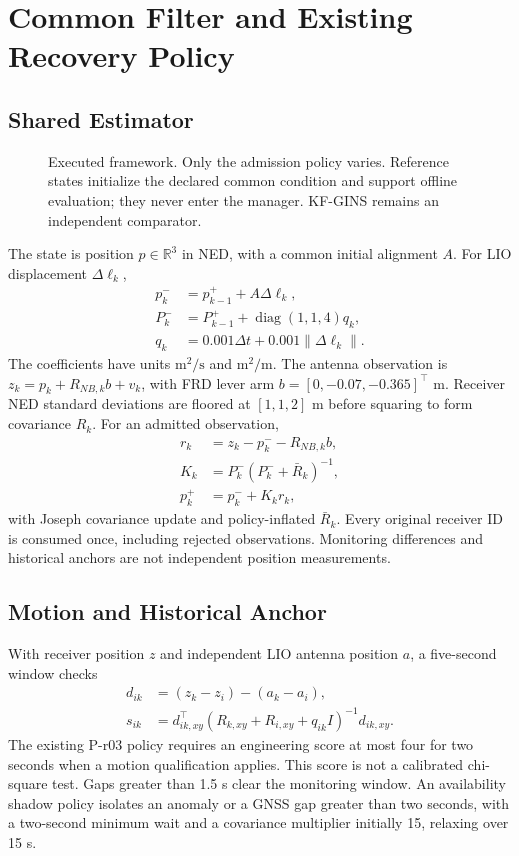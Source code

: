 \documentclass[conference]{IEEEtran}
\begin{document}
\section{Common Filter and Existing Recovery Policy}
\subsection{Shared Estimator}
\begin{figure}[t]
\centering

\caption{Executed framework. Only the admission policy varies. Reference states initialize the declared common condition and support offline evaluation; they never enter the manager. KF-GINS remains an independent comparator.}
\label{fig:framework}
\end{figure}
The state is position $p\in\mathbb{R}^{3}$ in NED, with a common initial alignment $A$. For LIO displacement $\Delta\ell_k$,
\begin{align}
 p_k^-&=p_{k-1}^++A\Delta\ell_k,\\
 P_k^-&=P_{k-1}^++\operatorname{diag}(1,1,4)q_k,\\
 q_k&=0.001\Delta t+0.001\|\Delta\ell_k\|.
\end{align}
The coefficients have units $\mathrm{m^2/s}$ and $\mathrm{m^2/m}$. The antenna observation is $z_k=p_k+R_{NB,k}b+v_k$, with FRD lever arm $b=[0,-0.07,-0.365]^\top$ m. Receiver NED standard deviations are floored at $[1,1,2]$ m before squaring to form covariance $R_k$. For an admitted observation,
\begin{align}
 r_k&=z_k-p_k^--R_{NB,k}b,\\
 K_k&=P_k^-(P_k^-+\bar R_k)^{-1},\\
 p_k^+&=p_k^-+K_kr_k,
\end{align}
with Joseph covariance update and policy-inflated $\bar R_k$. Every original receiver ID is consumed once, including rejected observations. Monitoring differences and historical anchors are not independent position measurements.

\subsection{Motion and Historical Anchor}
With receiver position $z$ and independent LIO antenna position $a$, a five-second window checks
\begin{align}
 d_{ik}&=(z_k-z_i)-(a_k-a_i),\\
 s_{ik}&=d_{ik,xy}^{\top}(R_{k,xy}+R_{i,xy}+q_{ik}I)^{-1}d_{ik,xy}.
\end{align}
The existing P-r03 policy requires an engineering score at most four for two seconds when a motion qualification applies. This score is not a calibrated chi-square test. Gaps greater than 1.5 s clear the monitoring window. An availability shadow policy isolates an anomaly or a GNSS gap greater than two seconds, with a two-second minimum wait and a covariance multiplier initially 15, relaxing over 15 s.
\end{document}
